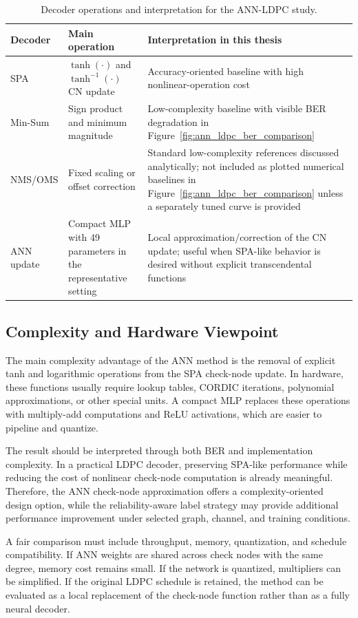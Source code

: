 \begin{table}[H]
\centering
\caption{Decoder operations and interpretation for the ANN-LDPC study.}
\label{tab:ann_ldpc_decoder_comparison}
\begin{tabularx}{\textwidth}{p{}p{}Y}
\toprule
Decoder & Main operation & Interpretation in this thesis\\
\midrule
SPA & $\tanh(\cdot)$ and $\tanh^{-1}(\cdot)$ CN update & Accuracy-oriented baseline with high nonlinear-operation cost\\
Min-Sum & Sign product and minimum magnitude & Low-complexity baseline with visible BER degradation in Figure~\ref{fig:ann_ldpc_ber_comparison}\\
NMS/OMS & Fixed scaling or offset correction & Standard low-complexity references discussed analytically; not included as plotted numerical baselines in Figure~\ref{fig:ann_ldpc_ber_comparison} unless a separately tuned curve is provided\\
ANN update & Compact MLP with 49 parameters in the representative setting & Local approximation/correction of the CN update; useful when SPA-like behavior is desired without explicit transcendental functions\\
\bottomrule
\end{tabularx}
\end{table}

\subsection{Complexity and Hardware Viewpoint}
The main complexity advantage of the ANN method is the removal of explicit tanh and logarithmic operations from the SPA check-node update. In hardware, these functions usually require lookup tables, CORDIC iterations, polynomial approximations, or other special units. A compact MLP replaces these operations with multiply-add computations and ReLU activations, which are easier to pipeline and quantize.

The result should be interpreted through both BER and implementation complexity. In a practical LDPC decoder, preserving SPA-like performance while reducing the cost of nonlinear check-node computation is already meaningful. Therefore, the ANN check-node approximation offers a complexity-oriented design option, while the reliability-aware label strategy may provide additional performance improvement under selected graph, channel, and training conditions.

A fair comparison must include throughput, memory, quantization, and schedule compatibility. If ANN weights are shared across check nodes with the same degree, memory cost remains small. If the network is quantized, multipliers can be simplified. If the original LDPC schedule is retained, the method can be evaluated as a local replacement of the check-node function rather than as a fully neural decoder.

